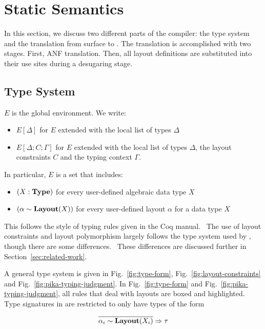 \section{Static Semantics}

In this section, we discuss two different parts of the \Pika{} compiler: the type system and the translation
from surface \Pika{} to \PikaCore. The translation is accomplished with two stages. First, ANF translation. Then,
all layout definitions are substituted into their use sites during a desugaring stage.

\subsection{\Pika{} Type System}

$E$ is the global environment. We write:

\begin{itemize}
  \item $E[\Delta]$ for $E$ extended with the local list of types $\Delta$
  \item $E[\Delta;C;\Gamma]$ for $E$ extended with the local list of types $\Delta$, the
    layout constraints $C$ and the typing context $\Gamma$.
\end{itemize}

\noindent
In particular, $E$ is a set that includes:
\begin{itemize}
  \item $(X : \textbf{Type})$ for every user-defined algebraic data type $X$
  \item $(\alpha \sim \textbf{Layout}(X))$ for every user-defined layout $\alpha$ for a data type $X$
\end{itemize}

\noindent
This follows the style of typing rules given in the Coq manual.~\cite{Coq-typing-rules} The use of layout constraints and layout
polymorphism largely follows the type system used by \Dargent, though there are some differences.~\cite{Dargent} These differences
are discussed further in Section~\ref{sec:related-work}.

A general type system is given in Fig.~\ref{fig:type-form}, Fig.~\ref{fig:layout-constraints} and Fig.~\ref{fig:pika-typing-judgment}. In
Fig.~\ref{fig:type-form} and Fig.~\ref{fig:pika-typing-judgment}, all rules that deal with layouts are boxed and highlighted. Type signatures
in \Pika{} are restricted to only have types of the form

\[
  \overline{\alpha_i \sim \textbf{Layout}(X_i)} \Rightarrow \tau
\]


